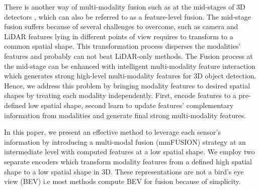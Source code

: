 \documentclass[10pt,twocolumn,letterpaper]{article}
\begin{document}
There is another way of multi-modality fusion such as at the mid-stages of 3D detectors \cite{liang2018deep, yoo20203d}, which can also be referred to as a feature-level fusion. The mid-stage fusion suffers because of several challenges to overcome, such as camera and LiDAR features lying in different points of view requires to transform to a common spatial shape. This transformation process disperses the modalities' features and probably can not beat LiDAR-only methods.
The Fusion process at the mid-stage can be enhanced with intelligent multi-modality feature interaction which generates strong high-level multi-modality features for 3D object detection. Hence, we address this problem by bringing modality features to desired spatial shapes by treating each modality independently. First, encode features to a pre-defined low spatial shape, second learn to update features' complementary information from modalities and generate final strong multi-modality features. 





In this paper, we present an effective method to leverage each sensor's information by introducing a multi-modal fusion (mmFUSION) strategy at an intermediate level with computed features at a low spatial shape. We employ two separate encoders which transform modality features from a defined high spatial shape to a low spatial shape in 3D. These representations are not a bird's eye view (BEV) i.e most methods compute BEV for fusion because of simplicity. 
\end{document}
